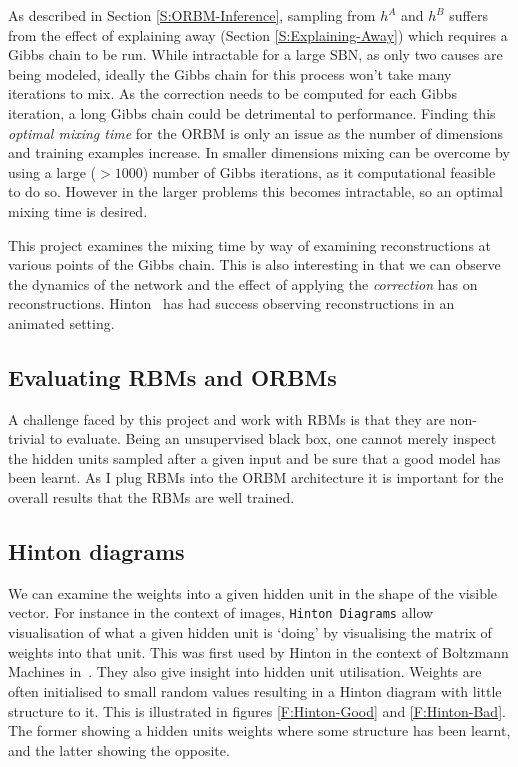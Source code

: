 As described in Section \ref{S:ORBM-Inference}, sampling from $h^A$ and $h^B$ suffers from the effect of explaining away (Section \ref{S:Explaining-Away}) which requires a Gibbs chain to be run. While intractable for a large SBN, as only two causes are being modeled, ideally the Gibbs chain for this process won't take many iterations to mix. As the correction needs to be computed for each Gibbs iteration, a long Gibbs chain could be detrimental to performance.
Finding this \emph{optimal mixing time} for the ORBM is only an issue as the number of dimensions and training examples increase. In smaller dimensions mixing can be overcome by using a large ($>1000$) number of Gibbs iterations, as it computational feasible to do so. However in the larger problems this becomes intractable, so an optimal mixing time is desired.

This project examines the mixing time by way of examining reconstructions at various points of the Gibbs chain. This is also interesting in that we can observe the dynamics of the network and the effect of applying the \emph{correction} has on reconstructions. Hinton~\cite{Hinton-Animations} has had success observing reconstructions in an animated setting.

\subsection{Evaluating RBMs and ORBMs}

  A challenge faced by this project and work with RBMs is that they are non-trivial to evaluate. Being an unsupervised black box, one cannot merely inspect the hidden units sampled after a given input and be sure that a good model has been learnt. As I plug RBMs into the ORBM architecture it is important for the overall results that the RBMs are well trained.

\subsection{Hinton diagrams}
  We can examine the weights into a given hidden unit in the shape of the visible vector. For instance in the context of images, \texttt{Hinton Diagrams} allow visualisation of what a given hidden unit is `doing' by visualising the matrix of weights into that unit. This was first used by Hinton in the context of Boltzmann Machines in~\cite{Hinton:1986:LRB:104279.104291}. They also give insight into hidden unit utilisation. Weights are often initialised to small random values resulting in a Hinton diagram with little structure to it. This is illustrated in figures \ref{F:Hinton-Good} and \ref{F:Hinton-Bad}. The former showing a hidden units weights where some structure has been learnt, and the latter showing the opposite.


